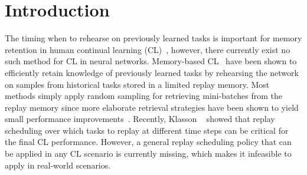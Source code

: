 
\section{Introduction}\label{paperD:sec:introduction}

The timing when to rehearse on previously learned tasks is important for memory retention in human continual learning (CL)~, however, there currently exist no such method for CL in neural networks. Memory-based CL~ have been shown to efficiently retain knowledge of previously learned tasks by rehearsing the network on samples from historical tasks stored in a limited replay memory. Most methods simply apply random sampling for retrieving mini-batches from the replay memory since more elaborate retrieval strategies have been shown to yield small performance improvements~. Recently, Klasson \etal~ showed that replay scheduling over which tasks to replay at different time steps can be critical for the final CL performance. However, a general replay scheduling policy that can be applied in any CL scenario is currently missing, which makes it infeasible to apply in real-world scenarios.


